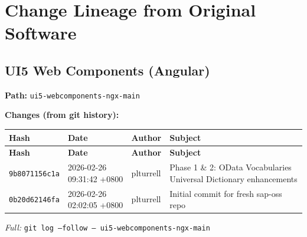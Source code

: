\documentclass[11pt]{article}
\begin{document}
\newpage
\section{Change Lineage from Original Software}

\subsection{UI5 Web Components (Angular)}
\textbf{Path:} \texttt{ui5-webcomponents-ngx-main}

\textbf{Changes (from git history):}
\begin{longtable}{|p{2.2cm}|p{3.2cm}|l|p{6cm}|}
\hline \textbf{Hash} & \textbf{Date} & \textbf{Author} & \textbf{Subject} \\ \hline \endfirsthead
\hline \textbf{Hash} & \textbf{Date} & \textbf{Author} & \textbf{Subject} \\ \hline \endhead
\texttt{9b8071156c1a} & 2026-02-26 09:31:42 +0800 & plturrell & Phase 1 \& 2: OData Vocabularies Universal Dictionary enhancements \\
\texttt{0b20d62146fa} & 2026-02-26 02:02:05 +0800 & plturrell & Initial commit for fresh sap-oss repo \\
\hline
\end{longtable}
\textit{Full:} \texttt{git log --follow -- ui5-webcomponents-ngx-main}
\end{document}
